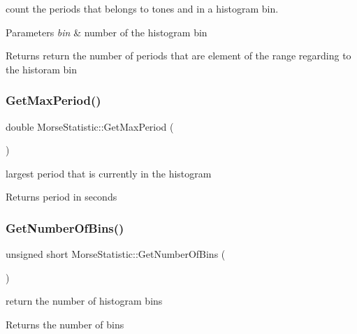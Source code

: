 count the periods that belongs to tones and in a histogram bin. 


\begin{DoxyParams}{Parameters}
{\em bin} & number of the histogram bin \\
\hline
\end{DoxyParams}
\begin{DoxyReturn}{Returns}
return the number of periods that are element of the range regarding to the historam bin 
\end{DoxyReturn}
\mbox{\label{classMorseStatistic_a4e421283bff64677db975e258f5c26d6}} 
\subsubsection{\texorpdfstring{Get\+Max\+Period()}{GetMaxPeriod()}}
{\footnotesize\ttfamily double Morse\+Statistic\+::\+Get\+Max\+Period (\begin{DoxyParamCaption}{ }\end{DoxyParamCaption})}



largest period that is currently in the histogram 

\begin{DoxyReturn}{Returns}
period in seconds 
\end{DoxyReturn}
\mbox{\label{classMorseStatistic_a7f74b33235ac1c347aa35c778914ca91}} 
\subsubsection{\texorpdfstring{Get\+Number\+Of\+Bins()}{GetNumberOfBins()}}
{\footnotesize\ttfamily unsigned short Morse\+Statistic\+::\+Get\+Number\+Of\+Bins (\begin{DoxyParamCaption}{ }\end{DoxyParamCaption})}



return the number of histogram bins 

\begin{DoxyReturn}{Returns}
the number of bins 
\end{DoxyReturn}
\mbox{\label{classMorseStatistic_adc79128f3c472bef513ce8546c833834}} 
